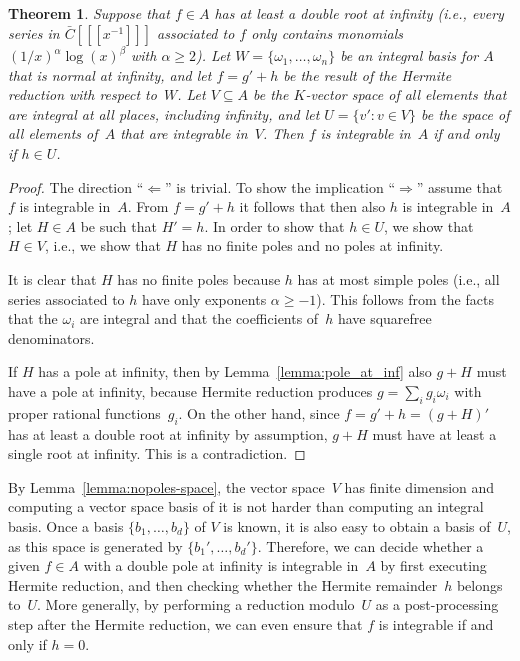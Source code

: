 \documentclass[final,1p,times,authoryear]{elsarticle}
\newtheorem{theorem}{Theorem}
\begin{document}
\begin{theorem}\label{thm:intiff0}
  Suppose that $f\in A$ has at least a double root at infinity (i.e., every
  series in $\bar C[[[x^{-1}]]]$ associated to $f$ only contains monomials
  $(1/x)^\alpha\log(x)^\beta$ with $\alpha\geq2$).
  Let $W=\{\omega_1,\dots,\omega_n\}$ be an integral basis for $A$ that is normal at infinity,
  and let $f=g'+h$ be the  result of the Hermite reduction with respect to~$W$.
  Let $V\subseteq A$ be the $K$-vector space of all elements that are integral at all places,
  including infinity, and let $U=\{v':v\in V\}$ be the space of all elements of~$A$
  that are integrable in~$V$.
  Then $f$ is integrable in~$A$ if and only if $h\in U$.
\end{theorem}

\begin{proof}
The direction ``$\Leftarrow$'' is trivial. To show the implication
``$\Rightarrow$'' assume that $f$ is integrable in~$A$. From $f=g'+h$ it follows that
then also $h$ is integrable in~$A$; let $H\in A$ be such that $H'=h$.  In order to show
that $h\in U$, we show that $H\in V$, i.e., we show that $H$ has no finite poles and
no poles at infinity.

It is clear that $H$ has no finite poles because $h$ has at most simple poles
(i.e., all series associated to $h$ have only exponents $\alpha\geq-1$).
This follows from the facts that the $\omega_i$ are integral and that
the coefficients of~$h$ have squarefree denominators.

If $H$ has a pole at infinity, then by Lemma~\ref{lemma:pole_at_inf} also
$g+H$ must have a pole at infinity, because Hermite reduction produces
$g=\sum_i g_i\omega_i$ with proper rational functions~$g_i$.  On the other
hand, since $f=g'+h=(g+H)'$ has at least a double root at infinity by
assumption, $g+H$ must have at least a single root at infinity. This is
a contradiction.
\end{proof}

By Lemma~\ref{lemma:nopoles-space}, the vector space~$V$ has finite dimension and computing a
vector space basis of it is not harder than computing an integral basis. Once
a basis $\{b_1,\dots,b_d\}$ of $V$ is known, it is also easy to obtain a basis
of~$U$, as this space is generated by $\{b_1',\dots,b_d'\}$. Therefore, we
can decide whether a given $f\in A$ with a double pole at infinity is integrable in~$A$
by first executing Hermite reduction, and then checking whether the Hermite
remainder~$h$ belongs to~$U$. More generally, by performing a reduction modulo~$U$
as a post-processing step after the Hermite reduction, we can even ensure that $f$
is integrable if and only if $h=0$.
\end{document}
